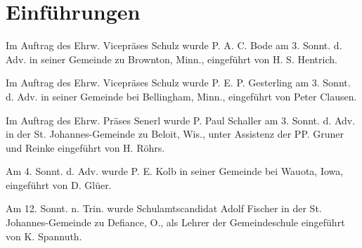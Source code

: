 \chapter[Einführungen]{Einführungen}
Im Auftrag des Ehrw. Vicepräses Schulz wurde P. A. C. Bode am 3. Sonnt. d. Adv. in seiner Gemeinde zu Brownton, Minn., eingeführt von H. S. Hentrich.

Im Auftrag des Ehrw. Vicepräses Schulz wurde P. E. P. Gesterling am 3. Sonnt. d. Adv. in seiner Gemeinde bei Bellingham, Minn., eingeführt von Peter Clausen.

Im Auftrag des Ehrw. Präses Senerl wurde P. Paul Schaller am 3. Sonnt. d. Adv. in der St. Johannes-Gemeinde zu Beloit, Wis., unter Assistenz der PP. Gruner und Reinke eingeführt von H. Röhrs.

Am 4. Sonnt. d. Adv. wurde P. E. Kolb in seiner Gemeinde bei Wauota, Iowa, eingeführt von D. Glüer.

Am 12. Sonnt. n. Trin. wurde Schulamtscandidat Adolf Fischer in der St. Johannes-Gemeinde zu Defiance, O., als Lehrer der Gemeindeschule eingeführt von K. Spannuth.
